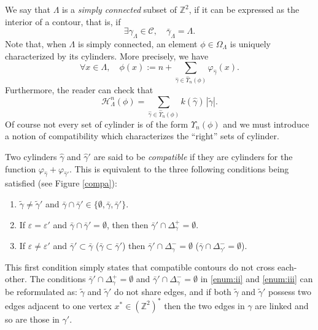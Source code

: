 \documentclass[10pt]{amsart}
\let\mathcal\mathscr
\newenvironment{enumeratei}
{\bgroup\def\theenumi{\roman{enumi}}\def\theenumii{\Alph{enumii}}\begin{enumerate}}
{\end{enumerate}\egroup}
\numberwithin{equation}{section}
\theoremstyle{plain}
\theoremstyle{definition}
\newcommand{\cH}{{\ensuremath{\mathcal H}} }
\newcommand{\cC}{{\ensuremath{\mathcal C}} }
\newcommand{\bbZ}{{\ensuremath{\mathbb Z}} }
\newcommand{\gep}{\varepsilon}
\newcommand{\gO}{\Omega}
\newcommand{\gL}{\Lambda}
\begin{document}
We say that $\gL$ is a \textit{simply connected} subset of $\bbZ^2$, if it can be expressed as the interior of a contour,
that is, if
\begin{equation} \label{connectedness}
\exists \gamma_{\gL}\in \cC, \quad \bar\gamma_{\gL}=\gL.
\end{equation}
Note that, when $\gL$ is simply connected,
an element
$\phi\in \gO_{\gL}$ is uniquely characterized by its cylinders. More precisely, we have
\begin{equation}\label{cylinder}
\forall x\in \gL, \quad \phi(x):= n+\sum_{\hat \gamma \in \hat \Upsilon_n(\phi)} \varphi_{\hat \gamma}(x).
\end{equation}
Furthermore, the reader can check that
\begin{equation}\label{express}
\cH^n_{\gL}(\phi)=\sum_{\hat \gamma \in \hat \Upsilon_n(\phi)} k(\hat \gamma)\,|\tilde \gamma|.
\end{equation}
Of course not every set of cylinder is of the form $\hat \Upsilon_n(\phi)$ and we must introduce a notion of compatibility
which characterizes the ``right'' sets of cylinder.

Two cylinders $\hat \gamma$ and $\hat \gamma'$ are said to be \emph{compatible} if they are
cylinders for the function $\varphi_{\hat \gamma}+\varphi_{\hat \gamma'}$.
This is equivalent to the three following conditions being satisfied
(see Figure \ref{compa}):
\begin{enumeratei}
\item\label{enum:i}
$\tilde \gamma\ne \tilde\gamma'$ and $\bar \gamma \cap \bar \gamma' \in\{\emptyset,\bar \gamma, \bar \gamma'\}$.
\item\label{enum:ii}
If $\gep= \gep'$ and $\bar\gamma\cap \bar \gamma'= \emptyset$, then
then $\bar \gamma'\cap \Delta^+_{\gamma}=\emptyset$.
\item\label{enum:iii}
If $\gep\ne \gep'$ and $\bar \gamma'\subset \bar \gamma$ (\resp $\bar \gamma\subset \bar \gamma'$) then
$\bar \gamma'\cap \Delta^-_{\gamma}=\emptyset$ (\resp $\bar \gamma\cap \Delta^-_{\gamma'}=\emptyset$).
\end{enumeratei}
This first condition simply states that compatible contours do not cross each-other.
The conditions $\bar \gamma'\cap \Delta^+_{\gamma}=\emptyset$ and $\bar \gamma'\cap \Delta^-_{\gamma}=\emptyset$ in \eqref{enum:ii} and \eqref{enum:iii}
can be reformulated as: $\tilde \gamma$ and $\tilde \gamma'$ do not share edges, and if both $\tilde \gamma$ and $\tilde \gamma'$ possess
two edges adjacent to one vertex
$x^*\in (\bbZ^2)^*$
then the two edges in $\gamma$ are linked and so are those in $\gamma'$.
\end{document}
